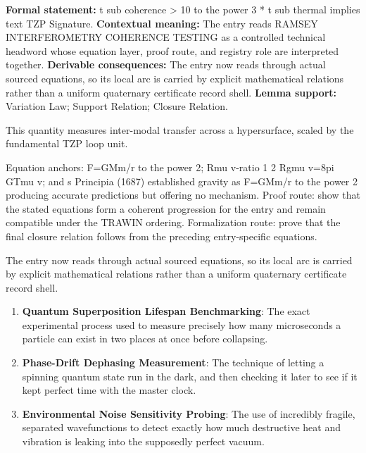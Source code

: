 \begingroup\footnotesize\setlength{\emergencystretch}{3em}\sloppy
\textbf{Formal statement:} t sub coherence > 10 to the power 3 * t sub thermal implies text TZP Signature. \textbf{Contextual meaning:} The entry reads RAMSEY INTERFEROMETRY COHERENCE TESTING as a controlled technical headword whose equation layer, proof route, and registry role are interpreted together. \textbf{Derivable consequences:} The entry now reads through actual sourced equations, so its local arc is carried by explicit mathematical relations rather than a uniform quaternary certificate record shell. \textbf{Lemma support:} Variation Law; Support Relation; Closure Relation.\par
\endgroup

This quantity measures inter-modal transfer across a hypersurface, scaled by the fundamental TZP loop unit.

Equation anchors: F=GMm/r to the power 2; Rmu v-ratio 1 2 Rgmu v=8pi GTmu v; and s Principia (1687) established gravity as F=GMm/r to the power 2 producing accurate predictions but offering no mechanism. Proof route: show that the stated equations form a coherent progression for the entry and remain compatible under the TRAWIN ordering. Formalization route: prove that the final closure relation follows from the preceding entry-specific equations.

The entry now reads through actual sourced equations, so its local arc is carried by explicit mathematical relations rather than a uniform quaternary certificate record shell.
\endgroup

\begin{enumerate}[leftmargin=1.6em,itemsep=6pt,topsep=4pt]
\item \textbf{Quantum Superposition Lifespan Benchmarking}: The exact experimental process used to measure precisely how many microseconds a particle can exist in two places at once before collapsing.
\item \textbf{Phase-Drift Dephasing Measurement}: The technique of letting a spinning quantum state run in the dark, and then checking it later to see if it kept perfect time with the master clock.
\item \textbf{Environmental Noise Sensitivity Probing}: The use of incredibly fragile, separated wavefunctions to detect exactly how much destructive heat and vibration is leaking into the supposedly perfect vacuum.
\end{enumerate}

